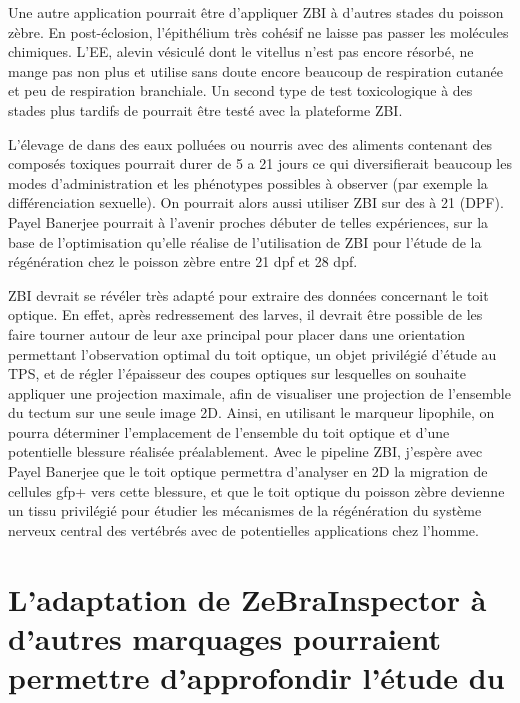 \documentclass[\main/main.tex]{subfiles}
\begin{document}
Une autre application pourrait être d'appliquer ZBI à  d'autres stades du poisson zèbre.  En post-éclosion, l'épithélium très cohésif ne laisse pas passer les molécules chimiques. L'EE, alevin vésiculé dont le vitellus n'est pas encore résorbé, ne mange pas non plus et utilise sans doute encore beaucoup de respiration cutanée et peu de respiration branchiale. Un second type de test toxicologique à des stades plus tardifs de \pz{} pourrait être testé avec la plateforme ZBI.

L'élevage de \pz{} dans des eaux polluées ou nourris avec des  aliments contenant des composés toxiques pourrait durer de 5 a 21 jours ce qui diversifierait beaucoup les modes d'administration et les phénotypes possibles à observer (par exemple la différenciation sexuelle). On pourrait alors aussi utiliser ZBI sur des \pz{} à 21 \dpf (DPF). Payel Banerjee pourrait à l'avenir proches débuter de telles expériences, sur la base de l'optimisation qu'elle réalise de l'utilisation de ZBI pour l'étude de la régénération chez le poisson zèbre entre 21 dpf et 28 dpf.

ZBI devrait se révéler très adapté pour extraire des données concernant le toit optique. En effet, après redressement des larves, il devrait être possible de les faire tourner autour de leur axe principal pour placer dans une orientation permettant l'observation optimal du toit optique, un objet privilégié d'étude au TPS, et de régler l'épaisseur des coupes optiques sur lesquelles on souhaite appliquer une projection maximale, afin de visualiser une projection de l'ensemble du tectum sur une seule image 2D. Ainsi, en utilisant le marqueur lipophile, on pourra déterminer l'emplacement de l'ensemble du toit optique et d'une potentielle blessure réalisée préalablement. Avec le pipeline ZBI, j'espère avec Payel Banerjee que le toit optique permettra d'analyser en 2D la migration de cellules gfp+ vers cette blessure, et que le toit optique du poisson zèbre devienne un tissu privilégié pour étudier les mécanismes de la régénération du système nerveux central des vertébrés avec de potentielles applications chez l'homme.

\section{L'adaptation de ZeBraInspector à d'autres marquages pourraient permettre d'approfondir l'étude du \pz{}}
\label{sec:label}
\end{document}
